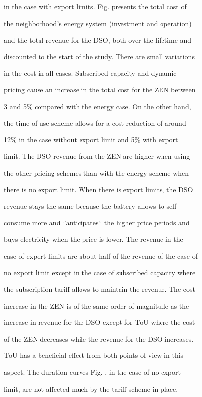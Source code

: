 \documentclass[a4paper,12pt]{article}
\begin{document}
in the case with export limits. Fig. presents the total cost of

the neighborhood’s energy system (investment and operation)

and the total revenue for the DSO, both over the lifetime and

discounted to the start of the study. There are small variations

in the cost in all cases. Subscribed capacity and dynamic

pricing cause an increase in the total cost for the ZEN between

3 and 5\% compared with the energy case. On the other hand,

the time of use scheme allows for a cost reduction of around

12\% in the case without export limit and 5\% with export

limit. The DSO revenue from the ZEN are higher when using

the other pricing schemes than with the energy scheme when

there is no export limit. When there is export limits, the DSO

revenue stays the same because the battery allows to self-

consume more and ”anticipates” the higher price periods and

buys electricity when the price is lower. The revenue in the

case of export limits are about half of the revenue of the case of

no export limit except in the case of subscribed capacity where

the subscription tariff allows to maintain the revenue. The cost

increase in the ZEN is of the same order of magnitude as the

increase in revenue for the DSO except for $\mathrm{T}\mathrm{o}\mathrm{U}$ where the cost

of the ZEN decreases while the revenue for the DSO increases.

$\mathrm{T}\mathrm{o}\mathrm{U}$ has a beneficial effect from both points of view in this

aspect. The duration curves Fig. , in the case of no export

limit, are not affected much by the tariff scheme in place.
\end{document}
